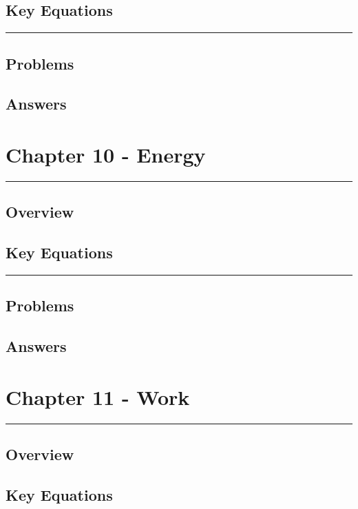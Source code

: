 \documentclass[a4paper,12pt]{article}
\begin{document}
\subsection*{Key Equations}

\begin{center}
  \rule{6cm}{0.5pt}
\end{center}
\subsection*{Problems}
\subsection*{Answers}

\pagebreak
\section*{Chapter 10 - Energy}
\rule{\linewidth}{1pt}
\subsection*{Overview}
\subsection*{Key Equations}

\begin{center}
  \rule{6cm}{0.5pt}
\end{center}
\subsection*{Problems}
\subsection*{Answers}

\pagebreak
\section*{Chapter 11 - Work}
\rule{\linewidth}{1pt}
\subsection*{Overview}
\subsection*{Key Equations}
\end{document}
